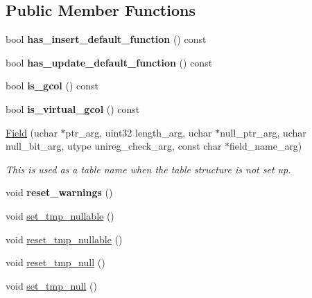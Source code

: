 \subsection*{Public Member Functions}
\begin{DoxyCompactItemize}
\item 
\mbox{\label{classField_a0d582d158ede1d833c590d03d1395d38}} 
bool {\bfseries has\+\_\+insert\+\_\+default\+\_\+function} () const
\item 
\mbox{\label{classField_ae94cbed913d9d849462986da8c942c5e}} 
bool {\bfseries has\+\_\+update\+\_\+default\+\_\+function} () const
\item 
\mbox{\label{classField_aaeaa282cefb9d22e0cc772a767c87f54}} 
bool {\bfseries is\+\_\+gcol} () const
\item 
\mbox{\label{classField_a12025dfe5965e552e2932878dce0d3ad}} 
bool {\bfseries is\+\_\+virtual\+\_\+gcol} () const
\item 
\mbox{\label{classField_a808c7a25fd7df0bedeee4f8e482318c5}} 
\mbox{\hyperlink{classField_a808c7a25fd7df0bedeee4f8e482318c5}{Field}} (uchar $\ast$ptr\+\_\+arg, uint32 length\+\_\+arg, uchar $\ast$null\+\_\+ptr\+\_\+arg, uchar null\+\_\+bit\+\_\+arg, utype unireg\+\_\+check\+\_\+arg, const char $\ast$field\+\_\+name\+\_\+arg)
\begin{DoxyCompactList}\small\item\em This is used as a table name when the table structure is not set up. \end{DoxyCompactList}\item 
\mbox{\label{classField_a042ae4f48c660e852b6e8278ce92d18c}} 
void {\bfseries reset\+\_\+warnings} ()
\item 
void \mbox{\hyperlink{classField_a734e817c5f4c21ea5e065d1c27a438b2}{set\+\_\+tmp\+\_\+nullable}} ()
\item 
void \mbox{\hyperlink{classField_a220414646b062b55c25017423f79e5cb}{reset\+\_\+tmp\+\_\+nullable}} ()
\item 
void \mbox{\hyperlink{classField_a55c0d34f3da0b578e1f94144b37f3853}{reset\+\_\+tmp\+\_\+null}} ()
\item 
void \mbox{\hyperlink{classField_a23c0718c0fe5c0cf2545c600e4c2dce9}{set\+\_\+tmp\+\_\+null}} ()

\end{DoxyCompactItemize}
